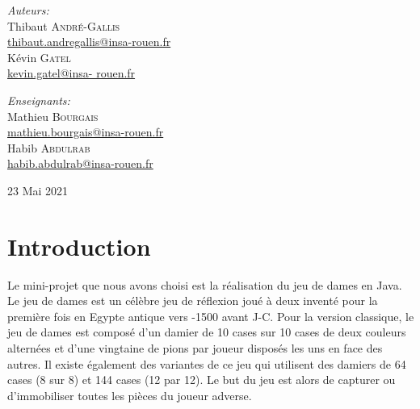 \documentclass[12,french]{report}
\begin{document}
\begin{titlepage}
\begin{center}
	\begin{minipage}{0.4\textwidth}
		\begin{flushleft} \large
			\emph{Auteurs:}\\
			Thibaut \textsc{André-Gallis} \\
			{\small\href{mailto:thibaut.andregallis@insa-rouen.fr}{thibaut.andregallis@insa-rouen.fr}} \\
			Kévin \textsc{Gatel} \\
			{\small\href{mailto:kevin.gatel@insa-rouen.fr}{kevin.gatel@insa-				rouen.fr}}
		\end{flushleft}
	\end{minipage}
	\begin{minipage}{0.4\textwidth}
		\begin{flushright} \large
			\emph{Enseignants:} \\
			Mathieu \textsc{Bourgais} \\
			{\small\href{mailto:mathieu.bourgais@insa-rouen.fr}								{mathieu.bourgais@insa-rouen.fr}}\\
			Habib \textsc{Abdulrab} \\
			{\small\href{mailto:habib.abdulrab@insa-rouen.fr}{habib.abdulrab@insa-rouen.fr}}
		\end{flushright}
	\end{minipage}

	\vfill
	{\large 23 Mai 2021}
\end{center}
\end{titlepage}

\tableofcontents


\renewcommand{\chaptername}{}
\chapter*{Introduction}

Le mini-projet que nous avons choisi est la réalisation du jeu de dames en Java.\\

Le jeu de dames est un célèbre jeu de réflexion joué à deux inventé pour la première fois en Egypte antique vers -1500 avant J-C.
Pour la version classique, le jeu de dames est composé d'un damier de 10 cases sur 10 cases de deux couleurs alternées et d'une vingtaine de pions par joueur disposés les uns en face des autres. Il existe également des variantes de ce jeu qui utilisent des damiers de 64 cases (8 sur 8) et 144 cases (12 par 12). 
Le but du jeu est alors de capturer ou d'immobiliser toutes les pièces du joueur adverse. \\
\end{document}
